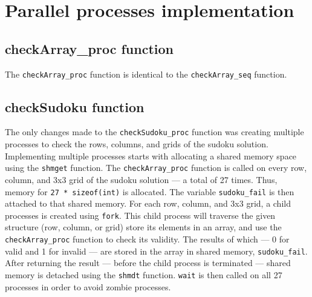 \documentclass[parallelismlabreport.tex]{subfiles}
\begin{document}
\section{Parallel processes implementation}
\subsection{checkArray\_proc function}
The \verb|checkArray_proc| function is identical to the \verb|checkArray_seq| function.

\subsection{checkSudoku function}
The only changes made to the \verb|checkSudoku_proc| function was creating multiple processes to check the rows, columns, and grids of the sudoku solution. 
%    
%    
%	
%
%
%
Implementing multiple processes starts with allocating a shared memory space using the \verb|shmget| function. The \verb|checkArray_proc| function is called on every row, column, and 3x3 grid of the sudoku solution --- a total of 27 times. Thus, memory for \verb|27 * sizeof(int)| is allocated. The variable \verb|sudoku_fail| is then attached to that shared memory. For each row, column, and 3x3 grid, a child processes is created using \verb|fork|. This child process will traverse the given structure (row, column, or grid) store its elements in an array, and use the \verb|checkArray_proc| function to check its validity. The results of which --- 0 for valid and 1 for invalid --- are stored in the array in shared memory, \verb|sudoku_fail|. After returning the result --- before the child process is terminated --- shared memory is detached using the \verb|shmdt| function. \verb|wait| is then called on all 27 processes in order to avoid zombie processes. 
\end{document}
